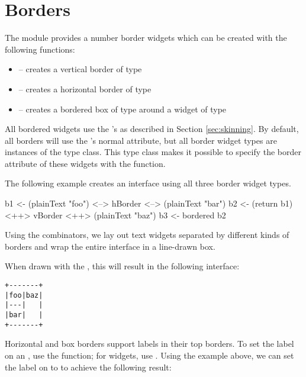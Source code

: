 \section{Borders}
\label{sec:borders}

The  module provides a number border widgets which can be
created with the following functions:

\begin{itemize}
\item {} -- creates a vertical border of type 
\item {} -- creates a horizontal border of type 
\item {} -- creates a bordered box of type  around a widget of type 
\end{itemize}

All bordered widgets use the 's  as
described in Section \ref{sec:skinning}.  By default, all borders will
use the 's normal attribute, but all border widget
types are instances of the  type class.  This type
class makes it possible to specify the border attribute of these
widgets with the  function.

The following example creates an interface using all three border
widget types.

\begin{haskellcode}
 b1 <- (plainText "foo") <--> hBorder <--> (plainText "bar")
 b2 <- (return b1) <++> vBorder <++> (plainText "baz")
 b3 <- bordered b2
\end{haskellcode}

Using the  combinators, we lay out text widgets separated by
different kinds of borders and wrap the entire interface in a
line-drawn box.

When drawn with the , this will result in the following
interface:

\begin{verbatim}
+-------+
|foo|baz|
|---|   |
|bar|   |
+-------+
\end{verbatim}

Horizontal and box borders support labels in their top borders.  To
set the label on an , use the 
function; for  widgets, use .
Using the example above, we can set the label on  to 
to achieve the following result:

